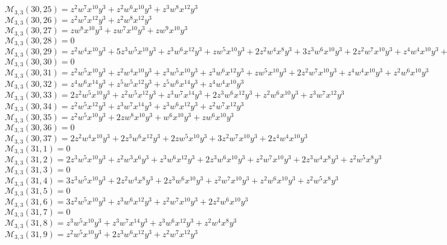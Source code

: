 $\mathcal{M}_{3,3}(30,25)=z^2w^7x^{10}y^3+z^2w^6x^{10}y^3+z^3w^8x^{12}y^3$\\
$\mathcal{M}_{3,3}(30,26)=z^2w^7x^{12}y^3+z^2w^8x^{12}y^3$\\
$\mathcal{M}_{3,3}(30,27)=zw^8x^{10}y^3+zw^7x^{10}y^3+zw^9x^{10}y^3$\\
$\mathcal{M}_{3,3}(30,28)=0$\\
$\mathcal{M}_{3,3}(30,29)=z^2w^4x^{10}y^3+5z^3w^5x^{10}y^3+z^3w^6x^{12}y^3+zw^5x^{10}y^3+2z^2w^4x^8y^3+3z^3w^6x^{10}y^3+2z^2w^7x^{10}y^3+z^4w^4x^{10}y^3+z^2w^5x^8y^3$\\
$\mathcal{M}_{3,3}(30,30)=0$\\
$\mathcal{M}_{3,3}(30,31)=z^2w^5x^{10}y^3+z^2w^4x^{10}y^3+z^3w^5x^{10}y^3+z^3w^6x^{12}y^3+zw^5x^{10}y^3+2z^2w^7x^{10}y^3+z^4w^4x^{10}y^3+z^2w^6x^{10}y^3$\\
$\mathcal{M}_{3,3}(30,32)=z^4w^6x^{14}y^3+z^5w^5x^{12}y^3+z^5w^6x^{14}y^3+z^4w^4x^{10}y^3$\\
$\mathcal{M}_{3,3}(30,33)=2z^2w^5x^{10}y^3+z^2w^5x^{12}y^3+z^3w^7x^{14}y^3+2z^3w^6x^{12}y^3+z^2w^6x^{10}y^3+z^3w^7x^{12}y^3$\\
$\mathcal{M}_{3,3}(30,34)=z^2w^5x^{12}y^3+z^3w^7x^{14}y^3+z^3w^6x^{12}y^3+z^2w^7x^{12}y^3$\\
$\mathcal{M}_{3,3}(30,35)=z^2w^5x^{10}y^3+2zw^8x^{10}y^3+w^6x^{10}y^3+zw^6x^{10}y^3$\\
$\mathcal{M}_{3,3}(30,36)=0$\\
$\mathcal{M}_{3,3}(30,37)=2z^2w^4x^{10}y^3+2z^3w^6x^{12}y^3+2zw^5x^{10}y^3+3z^2w^7x^{10}y^3+2z^4w^4x^{10}y^3$\\
$\mathcal{M}_{3,3}(31,1)=0$\\
$\mathcal{M}_{3,3}(31,2)=2z^3w^5x^{10}y^3+z^2w^3x^6y^3+z^3w^6x^{12}y^3+2z^3w^6x^{10}y^3+z^2w^7x^{10}y^3+2z^3w^4x^8y^3+z^2w^5x^8y^3$\\
$\mathcal{M}_{3,3}(31,3)=0$\\
$\mathcal{M}_{3,3}(31,4)=3z^3w^5x^{10}y^3+2z^2w^4x^8y^3+2z^3w^6x^{10}y^3+z^2w^7x^{10}y^3+z^2w^6x^{10}y^3+z^2w^5x^8y^3$\\
$\mathcal{M}_{3,3}(31,5)=0$\\
$\mathcal{M}_{3,3}(31,6)=3z^2w^5x^{10}y^3+z^3w^6x^{12}y^3+z^2w^7x^{10}y^3+2z^2w^6x^{10}y^3$\\
$\mathcal{M}_{3,3}(31,7)=0$\\
$\mathcal{M}_{3,3}(31,8)=z^3w^5x^{10}y^3+z^3w^7x^{14}y^3+z^3w^6x^{12}y^3+z^2w^4x^8y^3$\\
$\mathcal{M}_{3,3}(31,9)=z^2w^5x^{10}y^3+2z^3w^6x^{12}y^3+z^2w^7x^{12}y^3$\\
